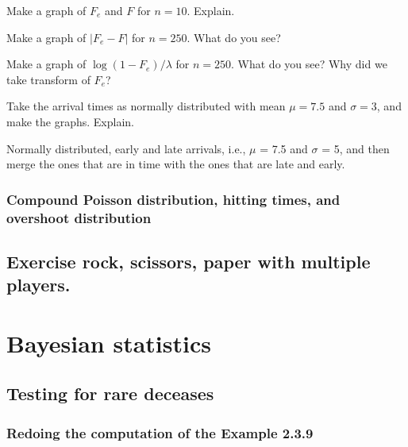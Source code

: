 \documentclass[a4paper]{article}
\begin{document}
\begin{exercise}
Make a graph of $F_e$ and $F$  for $n=10$. Explain. 
\end{exercise}

\begin{exercise}
Make a graph of  $|F_e - F|$  for $n=250$. What do you see?
\end{exercise}

\begin{exercise}
Make a graph of  $\log(1-F_e)/\lambda$  for $n=250$. What do you see? Why did we take transform of $F_e$?
\end{exercise}


\begin{exercise}
Take the arrival times as normally distributed with mean $\mu=7.5$ and $\sigma=3$, and make the graphs. Explain. 
\end{exercise}

Normally distributed, early and late arrivals, i.e., \(\mu\) = 7.5 and \(\sigma\) = 5, and then merge the ones that are in time with the ones that are late and early. 



\subsubsection{Compound Poisson distribution, hitting times, and overshoot distribution}
\label{sec:org0740c9c}


\subsection{Exercise rock, scissors, paper with multiple players.}
\label{sec:org351adb7}



\section{Bayesian statistics}
\label{sec:org1f4616c}

\subsection{Testing for rare deceases}
\label{sec:orgb704f64}

\subsubsection{Redoing the  computation of the  Example 2.3.9}
\label{sec:orge3a48cf}
\end{document}
